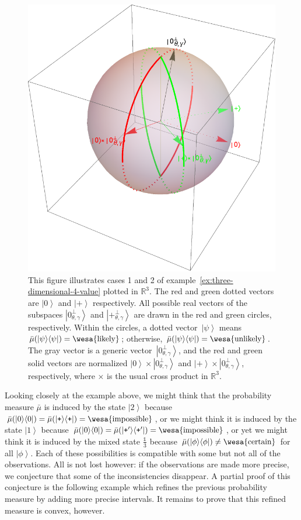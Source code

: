 \documentclass{article}
\theoremstyle{remark}
\newcommand{\imposs}{{\mbox{\wesa{impossible}}}}
\newcommand{\likely}{{\mbox{\wesa{likely}}}}
\newcommand{\unlikely}{{\mbox{\wesa{unlikely}}}}
\newcommand{\necess}{{\mbox{\wesa{certain}}}}
\newcommand{\ket}[1]{{\left\vert{#1}\right\rangle}}
\newcommand{\op}[2]{\ensuremath{\left\vert{#1}\middle\rangle\middle\langle{#2}\right\vert}}
\newcommand{\proj}[1]{\op{#1}{#1}}
\newcommand{\ps}{\texttt{+}}
\begin{document}
\begin{figure}
\begin{center}
\includegraphics[scale=0.38]{proposal/measure4.pdf}
\end{center}
\caption{\label{fig:three-dimensional-4-value}This figure illustrates
  cases 1 and 2 of example~\ref{ex:three-dimensional-4-value} plotted
  in $\mathbb{R}^{3}$. The red and green dotted vectors are $\ket{0}$
  and $\ket{\ps}$ respectively.  All possible real vectors of the subspaces
  $\ket{0_{\theta,\gamma}^{\perp}}$ and
  $\ket{\ps_{\theta,\gamma}^{\perp}}$ are drawn in the red and green
  circles, respectively. Within the circles, a dotted
  vector~$\ket{\psi}$ means $\bar{\mu}(\proj{\psi})=\likely$;
  otherwise, $\bar{\mu}(\proj{\psi})=\unlikely$. The gray vector is a
  generic vector~$\ket{0_{\theta,\gamma}^{\perp}}$, and the red and
  green solid vectors are normalized
  $\ket{0}\times\ket{0_{\theta,\gamma}^{\perp}}$ and
  $\ket{\ps}\times\ket{0_{\theta,\gamma}^{\perp}}$, respectively, where
  $\times$ is the usual cross product in $\mathbb{R}^{3}$.}
\end{figure}

Looking closely at the example above, we might think that the
probability measure $\bar{\mu}$ is induced by the state $\ket{2}$
because $\bar{\mu}(\proj{0})=\bar{\mu}(\proj{\ps})=\imposs$, or we
might think it is induced by the state $\ket{1}$ because
$\bar{\mu}(\proj{0})=\bar{\mu}(\proj{\ps'})=\imposs$, or yet we might
think it is induced by the mixed state $\frac{\mathbb{1}}{3}$ because
$\bar{\mu}(\proj{\phi})\ne\necess$ for all $\ket{\phi}$. Each of these
possibilities is compatible with some but not all of the
observations. All is not lost however: if the observations are made
more precise, we conjecture that some of the inconsistencies
disappear. A partial proof of this conjecture is the following example
which refines the previous probability measure by adding more precise
intervals. It remains to prove that this refined measure is convex,
however. 
\end{document}
